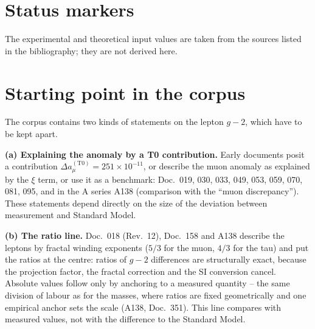 \section*{Status markers}

The experimental and theoretical input values are taken from the sources listed in the
bibliography; they are not derived here.

\section{Starting point in the corpus}
The corpus contains two kinds of statements on the lepton $g-2$, which have to be kept
apart.

\textbf{(a) Explaining the anomaly by a T0 contribution.} Early documents posit a
contribution $\Delta a_\mu^{(\mathrm{T0})}=251\times10^{-11}$, or describe the muon
anomaly as explained by the $\xi$ term, or use it as a benchmark: Doc.~019, 030, 033,
049, 053, 059, 070, 081, 095, and in the A series A138 (comparison with the ``muon
discrepancy''). These statements depend directly on the size of the deviation between
measurement and Standard Model.

\textbf{(b) The ratio line.} Doc.~018 (Rev.~12), Doc.~158 and A138 describe the leptons
by fractal winding exponents ($5/3$ for the muon, $4/3$ for the tau) and put the ratios
at the centre: ratios of $g-2$ differences are structurally exact, because the
projection factor, the fractal correction and the SI conversion cancel. Absolute values
follow only by anchoring to a measured quantity -- the same division of labour as for
the masses, where ratios are fixed geometrically and one empirical anchor sets the scale
(A138, Doc.~351). This line compares with measured values, not with the difference to
the Standard Model.

